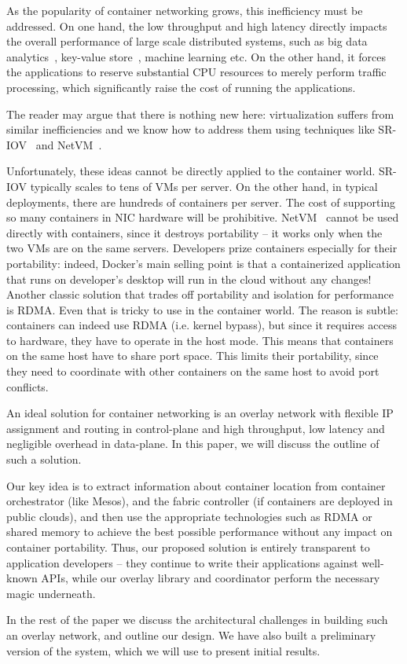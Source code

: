 As the popularity of container networking grows, this inefficiency must be
addressed. On one hand, the low throughput and high latency directly impacts
the overall performance of large scale distributed systems, such as big data
analytics~\cite{choudhury-paper}, key-value store~\cite{farm}, machine learning
etc.  On the other hand, it forces the applications to reserve substantial CPU
resources to merely perform traffic processing, which significantly raise the
cost of running the applications.

The reader may argue that there is nothing new here: virtualization suffers from
similar inefficiencies and we know how to address them using techniques like
SR-IOV~\cite{sriov} and NetVM~\cite{netvm}.

Unfortunately, these ideas cannot be directly applied to the container world.
SR-IOV typically scales to tens of VMs per server. On the other hand, in typical
deployments, there are hundreds of containers per server. The cost of supporting
so many containers in NIC hardware will be prohibitive. NetVM~\cite{netvm}
cannot be used directly with containers, since it destroys portability -- it
works only when the two VMs are on the same servers. Developers prize containers
especially for their portability: indeed, Docker's main selling point is that a
containerized application that runs on developer's desktop will run in the cloud
without any changes! Another classic solution that trades off portability and
isolation for performance is RDMA. Even that is tricky to use in the container
world. The reason is subtle: containers can indeed use RDMA (i.e. kernel
bypass), but since it requires access to hardware, they have to operate in the
host mode. This means that containers on the same host have to share port space.
This limits their portability, since they need to coordinate with other
containers on the same host to avoid port conflicts.

An ideal solution for container networking is an overlay network with flexible
IP assignment and routing in control-plane and high throughput, low latency and
negligible overhead in data-plane. In this paper, we will discuss the outline of
such a solution. 

Our key idea is to extract information about container location from container
orchestrator (like Mesos), and the fabric controller (if containers are deployed
in public clouds), and then use the appropriate technologies such as RDMA or
shared memory to achieve the best possible performance without any impact
on container portability. Thus, our proposed solution is entirely transparent to
application developers -- they continue to write their applications against
well-known APIs, while our overlay library and coordinator perform the necessary
magic underneath.

In the rest of the paper we discuss the architectural challenges in building
such an overlay network, and outline our design. We have also built a preliminary
version of the system, which we will use to present initial results.
